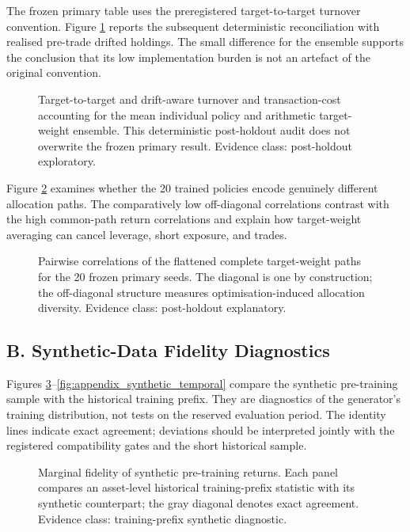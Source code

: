 The frozen primary table uses the preregistered target-to-target turnover
convention. Figure \ref{fig:appendix_drift_accounting} reports the subsequent
deterministic reconciliation with realised pre-trade drifted holdings. The
small difference for the ensemble supports the conclusion that its low
implementation burden is not an artefact of the original convention.

\begin{figure}[!tbp]
\centering

\caption{Target-to-target and drift-aware turnover and transaction-cost
accounting for the mean individual policy and arithmetic target-weight
ensemble. This deterministic post-holdout audit does not overwrite the frozen
primary result. Evidence class: post-holdout exploratory.}
\label{fig:appendix_drift_accounting}
\end{figure}

Figure \ref{fig:appendix_seed_correlation} examines whether the 20 trained
policies encode genuinely different allocation paths. The comparatively low
off-diagonal correlations contrast with the high common-path return
correlations and explain how target-weight averaging can cancel leverage,
short exposure, and trades.

\begin{figure}[!tbp]
\centering

\caption{Pairwise correlations of the flattened complete target-weight paths
for the 20 frozen primary seeds. The diagonal is one by construction; the
off-diagonal structure measures optimisation-induced allocation diversity.
Evidence class: post-holdout explanatory.}
\label{fig:appendix_seed_correlation}
\end{figure}

\clearpage
\subsection*{B. Synthetic-Data Fidelity Diagnostics}

Figures \ref{fig:appendix_synthetic_marginals}--\ref{fig:appendix_synthetic_temporal}
compare the synthetic pre-training sample with the historical training prefix.
They are diagnostics of the generator's training distribution, not tests on
the reserved evaluation period. The identity lines indicate exact agreement;
deviations should be interpreted jointly with the registered compatibility
gates and the short historical sample.

\begin{figure}[!tbp]
\centering

\caption{Marginal fidelity of synthetic pre-training returns. Each panel
compares an asset-level historical training-prefix statistic with its synthetic
counterpart; the gray diagonal denotes exact agreement. Evidence class:
training-prefix synthetic diagnostic.}
\label{fig:appendix_synthetic_marginals}
\end{figure}

